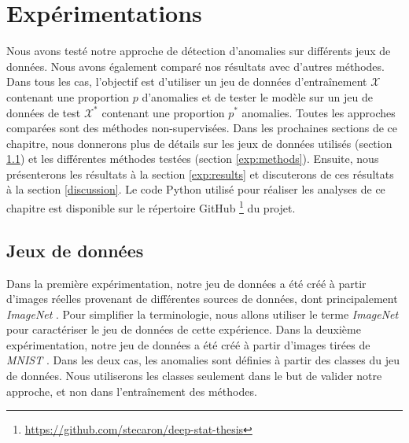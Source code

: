 \chapter{Expérimentations}     %
\label{chap:experiments}                   %

Nous avons testé notre approche de détection d'anomalies sur différents jeux de données. Nous avons également comparé nos résultats avec d'autres méthodes. Dans tous les cas, l'objectif est d'utiliser un jeu de données d'entraînement $\mathcal{X}$ contenant une proportion $p$ d'anomalies et de tester le modèle sur un jeu de données de test $\mathcal{X^*}$ contenant une proportion $p^*$ anomalies. Toutes les approches comparées sont des méthodes non-supervisées. Dans les prochaines sections de ce chapitre, nous donnerons plus de détails sur les jeux de données utilisés (section \ref{exp:datasets}) et les différentes méthodes testées (section \ref{exp:methods}). Ensuite, nous présenterons les résultats à la section \ref{exp:results} et discuterons de ces résultats à la section \ref{discussion}. Le code Python utilisé pour réaliser les analyses de ce chapitre est disponible sur le répertoire GitHub \footnote{\url{https://github.com/stecaron/deep-stat-thesis}} du projet.

\section{Jeux de données} \label{exp:datasets}

Dans la première expérimentation, notre jeu de données a été créé à partir d'images réelles provenant de différentes sources de données, dont principalement \textit{ImageNet} \citep{deng2009imagenet}. Pour simplifier la terminologie, nous allons utiliser le terme \textit{ImageNet} pour caractériser le jeu de données de cette expérience. Dans la deuxième expérimentation, notre jeu de données a été créé à partir d'images tirées de \textit{MNIST} \citep{lecun2010mnist}. Dans les deux cas, les anomalies sont définies à partir des classes du jeu de données. Nous utiliserons les classes seulement dans le but de valider notre approche, et non dans l'entraînement des méthodes.

